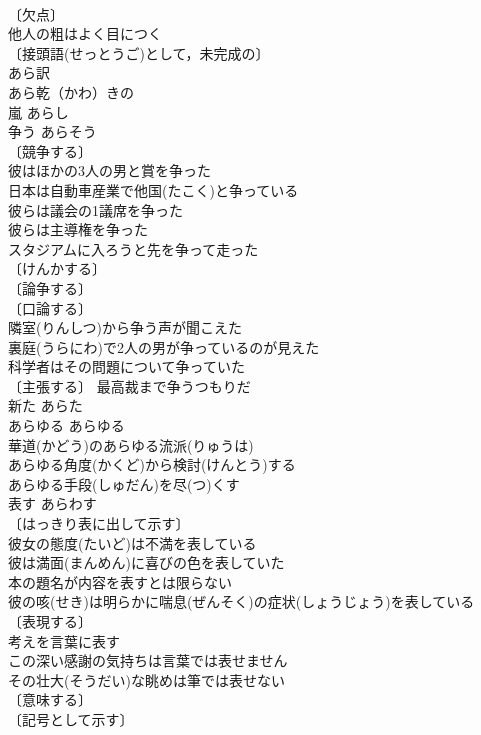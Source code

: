 \documentclass[8pt]{extreport}
\begin{document}
\begin{CJK}{UTF8}{min}
\\	〔欠点〕
\\	他人の粗はよく目につく 
\\	〔接頭語(せっとうご)として，未完成の〕
\\	あら訳 
\\	あら乾（かわ）きの 
\\	嵐	あらし	
\\	争う	あらそう	
\\	〔競争する〕
\\	彼はほかの3人の男と賞を争った 
\\	日本は自動車産業で他国(たこく)と争っている 
\\	彼らは議会の1議席を争った 
\\	彼らは主導権を争った 
\\	スタジアムに入ろうと先を争って走った 
\\	〔けんかする〕
\\	〔論争する〕
\\	〔口論する〕
\\	隣室(りんしつ)から争う声が聞こえた 
\\	裏庭(うらにわ)で2人の男が争っているのが見えた 
\\	科学者はその問題について争っていた 
\\	〔主張する〕 最高裁まで争うつもりだ 
\\	新た	あらた	
\\	あらゆる	あらゆる	
\\	華道(かどう)のあらゆる流派(りゅうは) 
\\	あらゆる角度(かくど)から検討(けんとう)する 
\\	あらゆる手段(しゅだん)を尽(つ)くす 
\\	表す	あらわす	
\\	〔はっきり表に出して示す〕
\\	彼女の態度(たいど)は不満を表している 
\\	彼は満面(まんめん)に喜びの色を表していた 
\\	本の題名が内容を表すとは限らない 
\\	彼の咳(せき)は明らかに喘息(ぜんそく)の症状(しょうじょう)を表している 
\\	〔表現する〕
\\	考えを言葉に表す 
\\	この深い感謝の気持ちは言葉では表せません 
\\	その壮大(そうだい)な眺めは筆では表せない 
\\	〔意味する〕
\\	〔記号として示す〕

\end{CJK}
\end{document}
